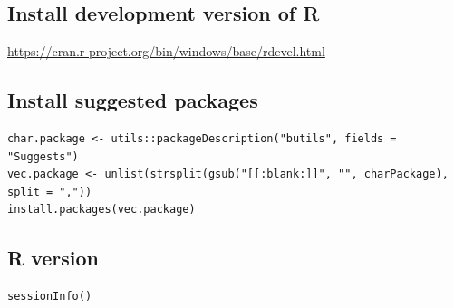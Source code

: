 \documentclass{article}
\begin{document}
\subsection{Install development version of R}
\label{sec:orgfcc29d2}
\url{https://cran.r-project.org/bin/windows/base/rdevel.html}

\subsection{Install suggested packages}
\label{sec:org054bac1}

\lstset{language=r,label= ,caption= ,captionpos=b,numbers=none}
\begin{lstlisting}
char.package <- utils::packageDescription("butils", fields = "Suggests")
vec.package <- unlist(strsplit(gsub("[[:blank:]]", "", charPackage), split = ","))
install.packages(vec.package)
\end{lstlisting}

\subsection{R version}
\label{sec:org57d18ea}

\lstset{language=r,label= ,caption= ,captionpos=b,numbers=none}
\begin{lstlisting}
sessionInfo()
\end{lstlisting}
\end{document}
